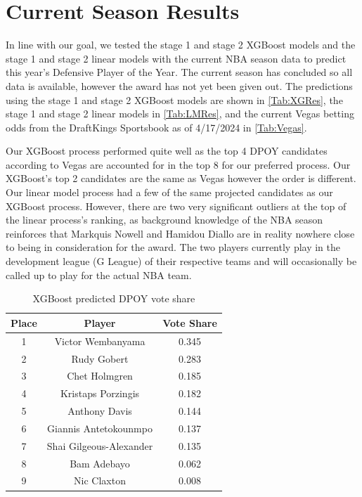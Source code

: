 \documentclass[letterpaper,titlepage]{article}
\begin{document}
    \section{Current Season Results}

    In line with our goal, we tested the stage 1 and stage 2 XGBoost models and the stage 1 and stage 2 linear models with the current NBA season data to predict this year's Defensive Player of the Year. The current season has concluded so all data is available, however the award has not yet been given out. The predictions using the stage 1 and stage 2 XGBoost models are shown in \autoref{Tab:XGRes}, the stage 1 and stage 2 linear models in \autoref{Tab:LMRes}, and the current Vegas betting odds from the DraftKings Sportsbook as of 4/17/2024 in \autoref{Tab:Vegas}.

    Our XGBoost process performed quite well as the top 4 DPOY candidates according to Vegas are accounted for in the top 8 for our preferred process. Our XGBoost's top 2 candidates are the same as Vegas however the order is different. Our linear model process had a few of the same projected candidates as our XGBoost process. However, there are two very significant outliers at the top of the linear process's ranking, as background knowledge of the NBA season reinforces that Markquis Nowell and Hamidou Diallo are in reality nowhere close to being in consideration for the award. The two players currently play in the development league (G League) of their respective teams and will occasionally be called up to play for the actual NBA team.

    \begin{table}[H]
        \centering
        \caption{XGBoost predicted DPOY vote share}
        \label{Tab:XGRes}
        \begin{tabular}{c|c|c}
            \textbf{Place} & \textbf{Player}         & \textbf{Vote Share} \\ \hline
            \rowcolor[HTML]{EFEFEF}
            1              & Victor Wembanyama       & 0.345               \\ 
            2              & Rudy Gobert             & 0.283               \\
            \rowcolor[HTML]{EFEFEF}
            3              & Chet Holmgren           & 0.185               \\ 
            4              & Kristaps Porzingis      & 0.182               \\
            \rowcolor[HTML]{EFEFEF} 
            5              & Anthony Davis           & 0.144               \\ 
            6              & Giannis Antetokounmpo   & 0.137               \\
            \rowcolor[HTML]{EFEFEF}
            7              & Shai Gilgeous-Alexander & 0.135               \\
            8              & Bam Adebayo             & 0.062               \\
            \rowcolor[HTML]{EFEFEF} 
            9              & Nic Claxton             & 0.008              
        \end{tabular}
    \end{table}
\end{document}
